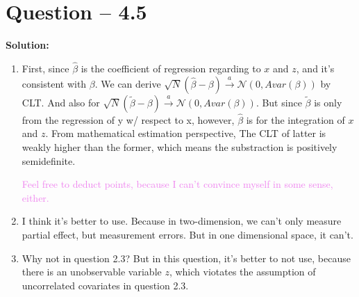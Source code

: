 \documentclass[11pt]{article} %
\begin{document}
\section{Question -- 4.5}
\textbf{Solution:}
\begin{enumerate}
    \item First, since $\hat{\beta}$ is the coefficient of regression regarding to $x$ and $z$, and it's consistent with $\beta$.
        We can derive $\sqrt{N}(\hat{\beta}-\beta)\xrightarrow{a}\mathcal{N}(0,Avar(\beta))$ by CLT. And also for $\sqrt{N}(\tilde{\beta}-\beta)\xrightarrow{a}\mathcal{N}(0,Avar(\beta))$. But since $\tilde{\beta}$ is only from the regression of y w/ respect to x, however, $\hat{\beta}$ is for the integration of $x$ and $z$.
        From mathematical estimation perspective, The CLT of latter is weakly higher than the former, which means the substraction is positively semidefinite.

        \textcolor{violet}{Feel free to deduct points, because I can't convince myself in some sense, either.}
    \item I think it's better to use. Because in two-dimension, we can't only measure partial effect, but measurement errors. But in one dimensional space, it can't.
    \item Why not in question 2.3? But in this question, it's better to not use, because there is an unobservable variable $z$, which viotates the assumption of uncorrelated covariates in question 2.3.
\end{enumerate}
\end{document}
